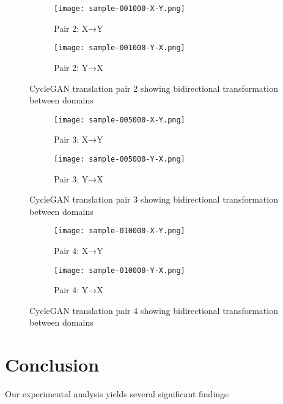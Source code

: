\documentclass{article}
\begin{document}
\begin{figure}[H]
\centering
\begin{subfigure}{0.45\textwidth}
    \texttt{[image: sample-001000-X-Y.png]}
    \caption{Pair 2: X→Y}
    \label{fig:cyclegan_pair2_XY}
\end{subfigure}
\hfill
\begin{subfigure}{0.45\textwidth}
    \texttt{[image: sample-001000-Y-X.png]}
    \caption{Pair 2: Y→X}
    \label{fig:cyclegan_pair2_YX}
\end{subfigure}
\caption{CycleGAN translation pair 2 showing bidirectional transformation between domains}
\label{fig:cyclegan_pair2}
\end{figure}

\begin{figure}[H]
\centering
\begin{subfigure}{0.45\textwidth}
    \texttt{[image: sample-005000-X-Y.png]}
    \caption{Pair 3: X→Y}
    \label{fig:cyclegan_pair3_XY}
\end{subfigure}
\hfill
\begin{subfigure}{0.45\textwidth}
    \texttt{[image: sample-005000-Y-X.png]}
    \caption{Pair 3: Y→X}
    \label{fig:cyclegan_pair3_YX}
\end{subfigure}
\caption{CycleGAN translation pair 3 showing bidirectional transformation between domains}
\label{fig:cyclegan_pair3}
\end{figure}

\begin{figure}[H]
\centering
\begin{subfigure}{0.45\textwidth}
    \texttt{[image: sample-010000-X-Y.png]}
    \caption{Pair 4: X→Y}
    \label{fig:cyclegan_pair4_XY}
\end{subfigure}
\hfill
\begin{subfigure}{0.45\textwidth}
    \texttt{[image: sample-010000-Y-X.png]}
    \caption{Pair 4: Y→X}
    \label{fig:cyclegan_pair4_YX}
\end{subfigure}
\caption{CycleGAN translation pair 4 showing bidirectional transformation between domains}
\label{fig:cyclegan_pair4}
\end{figure}

\section{Conclusion}
Our experimental analysis yields several significant findings:
\end{document}

